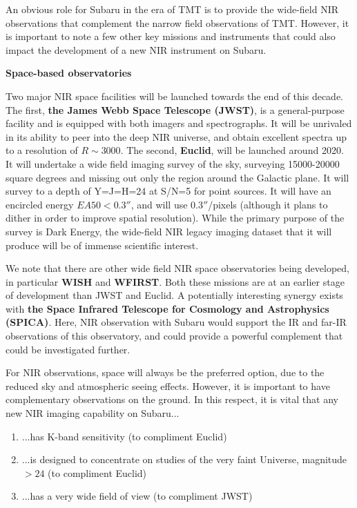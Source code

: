 An obvious role for Subaru in the era of TMT is to provide the
wide-field NIR observations that complement the narrow field
observations of TMT. However, it is important to note a few other key
missions and instruments that could also impact the development of a new
NIR instrument on Subaru. 

\par\noindent
{\bf Space-based observatories}

Two major NIR space facilities will be launched towards the end of this
decade. The first, {\bf the James Webb Space Telescope (JWST)}, is a
general-purpose facility and is equipped with both imagers and
spectrographs. It will be unrivaled in its ability to peer into the deep
NIR universe, and obtain excellent spectra up to a resolution of
$R\sim3000$. The second, {\bf Euclid}, will be launched around 2020. It
will undertake a wide field imaging survey of the sky, surveying
15000-20000 square degrees and missing out only the region around the
Galactic plane. It will survey to a depth of Y=J=H=24 at S/N=5 for point
sources. It will have an encircled energy $EA50<0.3''$, and will use
$0.3''$/pixels (although it plans to dither in order to improve spatial
resolution). While the primary purpose of the survey is Dark Energy, the
wide-field NIR legacy imaging dataset that it will produce will be of
immense scientific interest. 

We note that there are other wide field NIR space observatories being
developed, in particular {\bf WISH} and {\bf WFIRST}. Both these
missions are at an earlier stage of development than JWST and Euclid. A
potentially interesting synergy exists with {\bf the Space Infrared
Telescope for Cosmology and Astrophysics (SPICA)}. Here, NIR observation
with Subaru would support the IR and far-IR observations of this
observatory, and could provide a powerful complement that could be
investigated further.  

For NIR observations, space will always be the preferred option, due to
the reduced sky and atmospheric seeing effects. However, it is important
to have complementary observations on the ground. In this respect, it is
vital that any new NIR imaging capability on Subaru... 

\begin{enumerate} 
\item ...has K-band sensitivity (to compliment Euclid)
\item ...is designed to concentrate on studies of the very faint
      Universe, magnitude $>24$ (to compliment Euclid)  
\item ...has a very wide field of view (to compliment JWST)
\end{enumerate}

